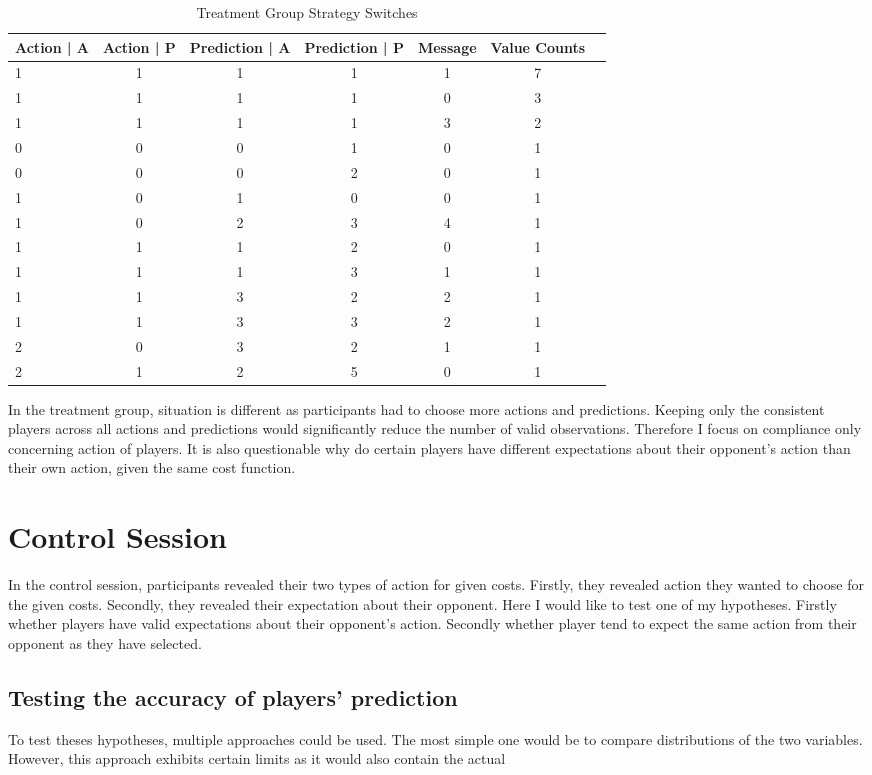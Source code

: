 \documentclass[
  digital, %
  twoside, %
  lof,     %
  lot,     %
]{fithesis4}
\begin{document}
\begin{table}
\centering
\begin{tabular}{lcccccr}
\hline
 Action | A & Action | P & Prediction | A & Prediction | P & Message & Value Counts \\
\hline
1 & 1 & 1 & 1 & 1 & 7 \\
1 & 1 & 1 & 1 & 0 & 3 \\
1 & 1 & 1 & 1 & 3 & 2 \\
0 & 0 & 0 & 1 & 0 & 1 \\
0 & 0 & 0 & 2 & 0 & 1 \\
1 & 0 & 1 & 0 & 0 & 1 \\
1 & 0 & 2 & 3 & 4 & 1 \\
1 & 1 & 1 & 2 & 0 & 1 \\
1 & 1 & 1 & 3 & 1 & 1 \\
1 & 1 & 3 & 2 & 2 & 1 \\
1 & 1 & 3 & 3 & 2 & 1 \\
2 & 0 & 3 & 2 & 1 & 1 \\
2 & 1 & 2 & 5 & 0 & 1 \\
\hline
\end{tabular}
\caption{Treatment Group Strategy Switches}
\end{table}

In the treatment group, situation is different as participants had to choose more actions and predictions. Keeping only the consistent players across all actions and predictions would significantly reduce the number of valid observations. Therefore I focus on compliance only concerning action of players. It is also questionable why do certain players have different expectations about their opponent's action than their own action, given the same cost function.

\section{Control Session}
In the control session, participants revealed their two types of action for given costs. Firstly, they revealed action they wanted to choose for the given costs. Secondly, they revealed their expectation about their opponent. Here I would like to test one of my hypotheses. Firstly whether players have valid expectations about their opponent's action. Secondly whether player tend to expect the same action from their opponent as they have selected.
\subsection{Testing the accuracy of players' prediction}
To test theses hypotheses, multiple approaches could be used. The most simple one would be to compare distributions of the two variables. However, this approach exhibits certain limits as it would also contain the actual 
\end{document}
